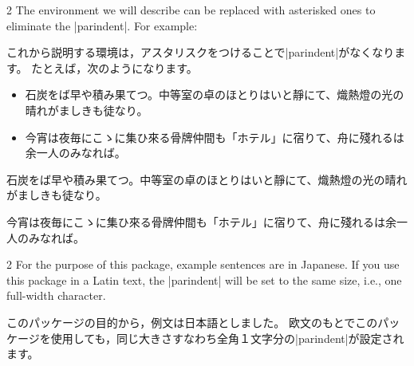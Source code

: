 \documentclass[%
fleqn,%
paper=a4paper,%
fontsize=10pt,%
open_bracket_pos=zenkakunibu_nibu,%
hanging_punctuation,%
]%
{jlreq}
\makeatletter
\DeclareRobustCommand{\linespace}{\@ifstar{\vspace{\baselineskip}}{\vspace{0.25\baselineskip}}}
\newenvironment{translateing}%
{\begin{multicolpar}{2}}
{\end{multicolpar}\vspace{\baselineskip}}
\makeatother
\begin{document}

\begin{translateing}
The environment we will describe can be replaced with asterisked ones to eliminate the |parindent|.
For example:

これから説明する環境は，アスタリスクをつけることで|parindent|がなくなります。
たとえば，次のようになります。
\end{translateing}

\noindent\hspace*{\fill}\hspace*{\fill}%
{\vspace{\baselineskip}}

\begin{macroexample}
\begin{itemize}
\item 石炭をば早や積み果てつ。中等室の卓のほとりはいと靜にて、熾熱燈の光の晴れがましきも徒なり。
\item 今宵は夜毎にこゝに集ひ來る骨牌仲間も「ホテル」に宿りて、舟に殘れるは余一人のみなれば。
\end{itemize}
\begin{itemize*}
\item 石炭をば早や積み果てつ。中等室の卓のほとりはいと靜にて、熾熱燈の光の晴れがましきも徒なり。
\item 今宵は夜毎にこゝに集ひ來る骨牌仲間も「ホテル」に宿りて、舟に殘れるは余一人のみなれば。
\end{itemize*}
\end{macroexample}

\begin{translateing}
For the purpose of this package, example sentences are in Japanese.
If you use this package in a Latin text, the |parindent| will be set to the same size, i.e., one full-width character.

このパッケージの目的から，例文は日本語としました。
欧文のもとでこのパッケージを使用しても，同じ大きさすなわち全角１文字分の|parindent|が設定されます。
\end{translateing}
\end{document}
